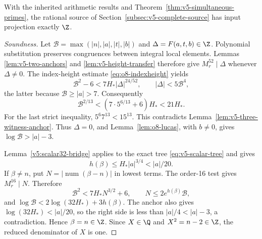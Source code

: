 \begin{theorem}
\label{thm:v5-source-projection}
With the inherited arithmetic results and
Theorem~\ref{thm:v5-simultaneous-primes}, the rational source of
Section~\ref{subsec:v5-complete-source} has input projection exactly $\Z$.
\end{theorem}
\begin{proof}[Soundness]
Let $\mathcal B=\max(|n|,|a|,|t|,|b|)$ and
$\Delta=F(a,t,b)\in\Z$. Polynomial substitution preserves
congruences between integral local elements. Lemmas
\ref{lem:v5-two-anchors} and \ref{lem:v5-height-transfer} therefore
give $M_r^{52}\mid\Delta$ whenever $\Delta\ne0$.
The index-height estimate \eqref{eq:o8-indexheight} yields
\[
 \mathcal B^2-6<7H_*|\Delta|^{24/52},\qquad
 |\Delta|<5\mathcal B^4,
\]
the latter because $\mathcal B\ge|a|>7$. Consequently
\[
 \mathcal B^{2/13}<(7\cdot5^{6/13}+6)H_*<21H_*.
\]
For the last strict inequality, $5^6 7^{13}<15^{13}$.
This contradicts Lemma~\ref{lem:v5-three-witness-anchor}. Thus
$\Delta=0$, and Lemma~\ref{lem:o8-lucas}, with $b\ne0$, gives
$\log\mathcal B>|a|-3$.

Lemma~\ref{v5:scalar32-bridge} applies to the exact tree
\eqref{eq:v5-scalar-tree} and gives
\[
 h(\beta)\le H_*|a|^{3/4}<|a|/20.
\]
If $\beta\ne n$, put $N=|\operatorname{num}(\beta-n)|$ in lowest
terms. The order-16 test gives $M_r^{16}\mid N$. Therefore
\[
 \mathcal B^2<7H_*N^{3/2}+6,\qquad
 N\le2e^{h(\beta)}\mathcal B,
\]
and $\log\mathcal B<2\log(32H_*)+3h(\beta)$.
The anchor also gives $\log(32H_*)<|a|/20$, so the right side
is less than $|a|/4<|a|-3$, a contradiction. Hence
$\beta=n\in\Z$. Since $X\in\Q$ and $X^2=n-2\in\Z$,
the reduced denominator of $X$ is one.
\end{proof}

